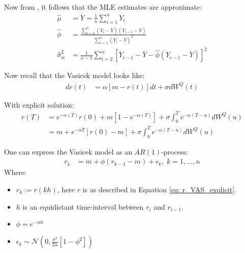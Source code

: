 Now from \cite{remillard2013statistical}, it follows that the MLE estimates are approximate: 
\begin{align*}
\hat{\mu} &= \overline{Y} = \frac{1}{n}\sum_{i=1}^{n}Y_{i} \\ 
\hat{\phi} &= \frac{
\sum_{i=2}^{n}(Y_{i}-\overline{Y})(Y_{i-1}-\overline{Y})
}{
\sum_{i=1}^{n}(Y_{i}-\overline{Y})^{2}
} \\ 
\hat{\sigma}^{2}_{w} &= 
\frac{1}{n-1}\sum_{i=2}^{n}[
Y_{i-1}-\overline{Y} -\hat{\phi}(Y_{i-1}-\overline{Y})
]^{2}
\end{align*}


Now recall that the Vasicek model looks like:
\begin{align*}
dr(t) &= \alpha[m - r(t)]dt + \sigma dW^{Q}(t)    
\end{align*}

With explicit solution:
\begin{align}
\label{eq: r_VAS_explicit}
r(T) &= e^{-\alpha(T)}r(0) + m[1-e^{-\alpha(T)}] 
+ \sigma \int_{0}^{T}e^{-\alpha(T-u)}dW^{Q}(u) \nonumber \\ 
&= 
m + e^{-\alpha T}\left[r(0) -m \right]
+ \sigma \int_{0}^{T}e^{-\alpha(T-u)}dW^{Q}(u)
\end{align} 


\begin{proposition}
One can express the Vasicek model as an $AR(1)$-process: 
\begin{align}
\label{eq: r_AR(1)}
r_{k} &= m + \phi (r_{k-1}-m) + \epsilon_{k}, \; k = 1, \dots, n     
\end{align}
Where:
\begin{itemize}[leftmargin =*]
    \item $r_{k} := r(kh)$, here $r$ is as described in Equation \ref{eq: r_VAS_explicit}. 
    \item $h$ is an equidistant time-interval between $r_{i}$ and $r_{i-1}$. 
    \item $\phi = e^{-\alpha h}$
    \item $\epsilon_{k} \sim \mathcal{N}\left(
    0, \frac{\sigma^{2}}{2\alpha}\left[
    1-\phi^{2}
    \right]\right)$
\end{itemize}
\end{proposition}

